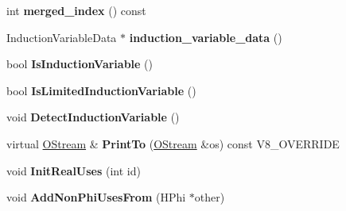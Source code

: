 \begin{DoxyCompactItemize}
\item 
\hypertarget{classv8_1_1internal_1_1_v8___f_i_n_a_l_ac1a135e0f29360fd40b0e2c89f0197a5}{}int {\bfseries merged\+\_\+index} () const \label{classv8_1_1internal_1_1_v8___f_i_n_a_l_ac1a135e0f29360fd40b0e2c89f0197a5}

\item 
\hypertarget{classv8_1_1internal_1_1_v8___f_i_n_a_l_a7f6c8c03139f75ee1ad948db6dfe217c}{}Induction\+Variable\+Data $\ast$ {\bfseries induction\+\_\+variable\+\_\+data} ()\label{classv8_1_1internal_1_1_v8___f_i_n_a_l_a7f6c8c03139f75ee1ad948db6dfe217c}

\item 
\hypertarget{classv8_1_1internal_1_1_v8___f_i_n_a_l_ab128f4e5915e21517017cbc43c38e2af}{}bool {\bfseries Is\+Induction\+Variable} ()\label{classv8_1_1internal_1_1_v8___f_i_n_a_l_ab128f4e5915e21517017cbc43c38e2af}

\item 
\hypertarget{classv8_1_1internal_1_1_v8___f_i_n_a_l_ad80baad542e8b912a0afb34a5a9490b7}{}bool {\bfseries Is\+Limited\+Induction\+Variable} ()\label{classv8_1_1internal_1_1_v8___f_i_n_a_l_ad80baad542e8b912a0afb34a5a9490b7}

\item 
\hypertarget{classv8_1_1internal_1_1_v8___f_i_n_a_l_a477957e848ebe69dc23fffb711178929}{}void {\bfseries Detect\+Induction\+Variable} ()\label{classv8_1_1internal_1_1_v8___f_i_n_a_l_a477957e848ebe69dc23fffb711178929}

\item 
\hypertarget{classv8_1_1internal_1_1_v8___f_i_n_a_l_a3a6f3a470f200862d9e97e85278c5155}{}virtual \hyperlink{classv8_1_1internal_1_1_o_stream}{O\+Stream} \& {\bfseries Print\+To} (\hyperlink{classv8_1_1internal_1_1_o_stream}{O\+Stream} \&os) const V8\+\_\+\+O\+V\+E\+R\+R\+I\+D\+E\label{classv8_1_1internal_1_1_v8___f_i_n_a_l_a3a6f3a470f200862d9e97e85278c5155}

\item 
\hypertarget{classv8_1_1internal_1_1_v8___f_i_n_a_l_acf843f4764dbfd096c29ed517046e258}{}void {\bfseries Init\+Real\+Uses} (int id)\label{classv8_1_1internal_1_1_v8___f_i_n_a_l_acf843f4764dbfd096c29ed517046e258}

\item 
\hypertarget{classv8_1_1internal_1_1_v8___f_i_n_a_l_a1affc4033e7bcab551d95189feb51de0}{}void {\bfseries Add\+Non\+Phi\+Uses\+From} (H\+Phi $\ast$other)\label{classv8_1_1internal_1_1_v8___f_i_n_a_l_a1affc4033e7bcab551d95189feb51de0}


\end{DoxyCompactItemize}
